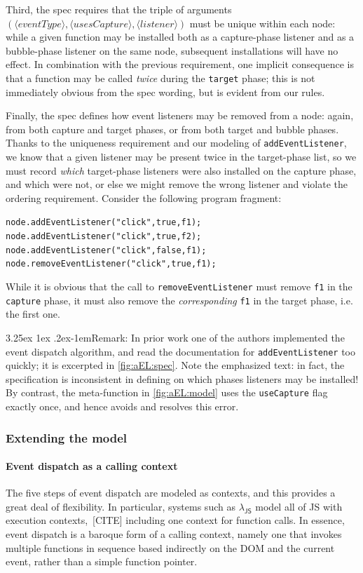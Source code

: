 \documentclass[letterpaper,10pt,twocolumn]{article}
\makeatletter
\newcommand{\paraemph}{\@startsection{paragraph}{4}{\z@}%
  {3.25ex \@plus 1ex \@minus .2ex}{-1em}{\normalfont\normalsize\itshape}}
\newcommand{\quot}{\mbox{\tt\char'042}}
\newcommand{\wild}{\mbox{\tt\char'137}}
\newcommand{\impl}[1]{{\def\_{\wild}\def\"{\quot}\tt#1}}
\newcommand{\kw}[1]{\ensuremath{\langle\mathit{#1}\rangle}}
\DeclareRobustCommand{\spec}[1]{\textsf{#1}\xspace}
\DeclareRobustCommand\JS{\spec{JS}}
\DeclareRobustCommand{\LJS}{\ensuremath{\lambda_\JS}\xspace}
\makeatother
\begin{document}
Third, the spec requires that the triple of arguments
$(\kw{eventType}, \kw{usesCapture}, \kw{listener})$ must be unique
within each node: while a given function may be installed both as a
capture-phase listener and as a bubble-phase listener on the same
node, subsequent installations will have no effect.  In combination
with the previous requirement, one implicit consequence is that a
function may be called \emph{twice} during the \impl{target} phase;
this is not immediately obvious from the spec wording, but is evident
from our rules.

Finally, the spec defines how event listeners may be removed from a
node: again, from both capture and target phases, or from both target
and bubble phases.  Thanks to the uniqueness requirement and our
modeling of \impl{addEventListener}, we know that a given listener may
be present twice in the target-phase list, so we must record
\emph{which} target-phase listeners were also installed on the capture
phase, and which were not, or else we might remove the wrong listener
and violate the ordering requirement.  Consider the following program
fragment:
\begin{alltt}
node.addEventListener("click", true, f1);
node.addEventListener("click", true, f2);
node.addEventListener("click", false, f1);
node.removeEventListener("click", true, f1);
\end{alltt}
While it is obvious that the call to \impl{removeEventListener} must
remove \impl{f1} in the \impl{capture} phase, it must also remove the
\emph{corresponding} \impl{f1} in the target phase, i.e. the first
one.  

\paraemph{Remark: } In prior work one of the authors implemented
the event dispatch algorithm, and read the documentation for
\impl{addEventListener} too quickly; it is excerpted in
\cref{fig:aEL:spec}.  Note the emphasized text: in fact, the specification
is inconsistent in defining on which phases listeners may be
installed!  By contrast, the meta-function in \cref{fig:aEL:model} uses
the \impl{useCapture} flag exactly once, and hence avoids and resolves
this error.

\subsubsection{Extending the model}
\paragraph{Event dispatch as a calling context} 
The five steps of event dispatch are modeled as contexts, and this
provides a great deal of flexibility.  In particular, systems such as
\LJS model all of \JS with execution contexts,~[CITE] including one context
for function calls.  In essence, event dispatch is a baroque form of a
calling context, namely one that invokes multiple functions in
sequence based indirectly on the DOM and the current event, rather
than a simple function pointer.
\end{document}
